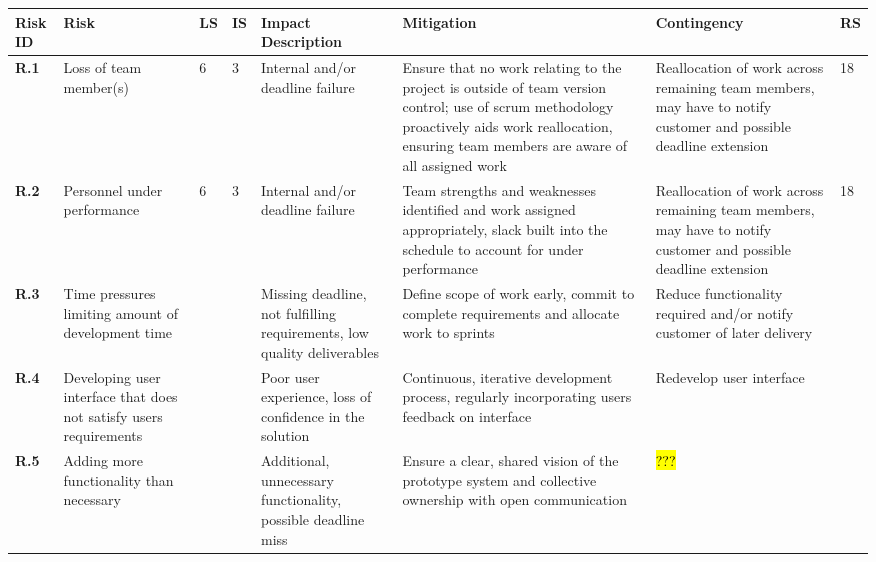 \begin{longtable}[H]{| p{0.65cm} | p{2cm} | p{0.3cm} | p{0.3cm} | p{2.4cm} | p{3cm} | p{2.7cm} | p{0.4cm} |}
  \hline
  \cellcolor{titleColor}\textbf{Risk ID} &
  \cellcolor{titleColor}\textbf{Risk} &
  \cellcolor{titleColor}\textbf{LS} &
  \cellcolor{titleColor}\textbf{IS} &
  \cellcolor{titleColor}\textbf{Impact Description} &
  \cellcolor{titleColor}\textbf{Mitigation} &
  \cellcolor{titleColor}\textbf{Contingency} &
  \cellcolor{titleColor}\textbf{RS}\\
  
  \hline \textbf{R.1}
  & Loss of team member(s)
  & 6
  & 3
  & Internal and/or deadline failure
  & Ensure that no work relating to the project is outside of team
  version control; use of scrum methodology proactively aids work
  reallocation, ensuring team members are aware of all assigned work
  & Reallocation of work across remaining team members, may have to notify customer and possible deadline extension
  & 18 \\
  
  \hline \textbf{R.2}
  & Personnel under performance
  & 6
  & 3
  & Internal and/or deadline failure
  & Team strengths and weaknesses identified and work assigned appropriately, slack built into the schedule to account for under performance
  & Reallocation of work across remaining team members, may have to notify customer and possible deadline extension
  & 18 \\
  
  \hline \textbf{R.3}
  & Time pressures limiting amount of development time
  & 
  & 
  & Missing deadline, not fulfilling requirements, low quality deliverables
  & Define scope of work early, commit to complete requirements and allocate work to sprints 
  & Reduce functionality required and/or notify customer of later delivery
  & \\
  
  \hline \textbf{R.4}
  & Developing user interface that does not satisfy users requirements
  & 
  & 
  & Poor user experience, loss of confidence in the solution
  & Continuous, iterative development process, regularly incorporating users feedback on interface
  & Redevelop user interface
  & \\
  
  \hline \textbf{R.5}
  & Adding more functionality than necessary
  & 
  & 
  & Additional, unnecessary functionality, possible deadline miss
  & Ensure a clear, shared vision of the prototype system and collective ownership with open communication
  & \hl{???}
  & \\
  

\end{longtable}
